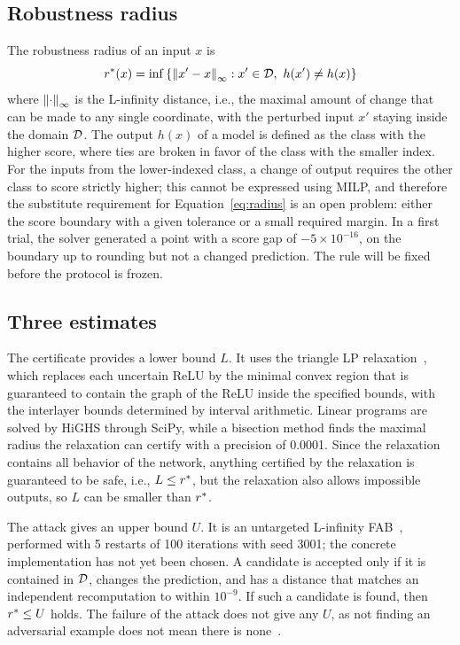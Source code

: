 \subsection{Robustness radius}
\label{sec:method-radius}

The robustness radius of an input $x$ is
\begin{equation}
  r^{*}(x) = \inf \left\{ \left\lVert x' - x \right\rVert_\infty : x' \in \mathcal{D},\ h(x') \neq h(x) \right\}
  \label{eq:radius}
\end{equation}
where $\left\lVert \cdot \right\rVert_\infty$ is the L-infinity distance, i.e., the maximal amount of change that can be
made to any single coordinate, with the perturbed input $x'$ staying inside the domain $\mathcal{D}$. The
output $h(x)$ of a model is defined as the class with the higher score, where ties
are broken in favor of the class with the smaller index. For the inputs from the lower-indexed
class, a change of output requires the other class to score strictly higher; this
cannot be expressed using MILP, and therefore the substitute requirement for
Equation~\eqref{eq:radius} is an open problem: either the score boundary with a
given tolerance or a small required margin. In a first trial, the solver generated
a point with a score gap of $-5 \times 10^{-16}$, on the boundary
up to rounding but not a changed prediction. The rule will be fixed before the protocol is
frozen.

\subsection{Three estimates}
\label{sec:method-estimates}

The certificate provides a lower bound $L$. It uses the triangle LP
relaxation~\cite{MapSource09}, which replaces each uncertain ReLU by the minimal
convex region that is guaranteed to contain the graph of the ReLU inside the specified bounds, with
the interlayer bounds determined by interval arithmetic. Linear programs are solved by HiGHS
through SciPy, while a bisection method finds the maximal radius the relaxation can certify with
a precision of 0.0001. Since the relaxation contains all behavior of the network,
anything certified by the relaxation is guaranteed to be safe, i.e., $L \le r^{*}$, but
the relaxation also allows impossible outputs, so $L$ can be
smaller than $r^{*}$.

The attack gives an upper bound $U$. It is an untargeted L-infinity FAB~\cite{MapSource05},
performed with 5 restarts of 100 iterations with seed 3001; the concrete implementation has not yet
been chosen. A candidate is accepted only if it is contained in $\mathcal{D}$, changes the
prediction, and has a distance that matches an
independent recomputation to within $10^{-9}$. If such a candidate is found, then $r^{*} \le U$
holds. The failure of the attack does not give any $U$, as not finding an
adversarial example does not mean there is none~\cite{MapSource03}.

